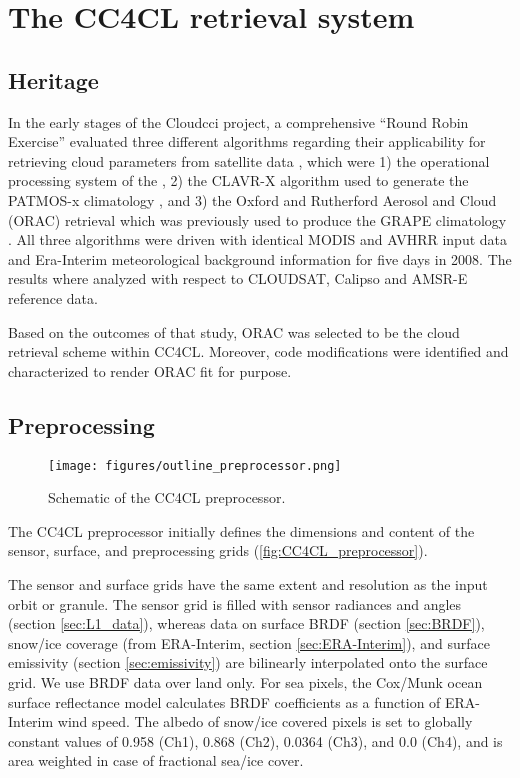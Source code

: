 \section{The CC4CL retrieval system}\label{processing_chain}

\subsection{Heritage}

In the early stages of the Cloud\textunderscore cci project, a comprehensive ``Round Robin Exercise'' evaluated
three different algorithms regarding their applicability for retrieving cloud parameters from satellite data
\citep{Stengel15}, which were 1) the operational processing system of the \citet{CMSAF_web}, 2) the CLAVR-X algorithm
used to generate the PATMOS-x climatology \citep{Heidinger13}, and 3) the Oxford and Rutherford Aerosol and
Cloud (ORAC) retrieval \citep{Thomas09, Poulsen12} which was previously used to produce the GRAPE climatology
\citep{Thomas09_GRAPE, GRAPE_web}. All three algorithms were driven with identical MODIS and AVHRR input data
and Era-Interim meteorological background information for five days in 2008. The results where analyzed with
respect to CLOUDSAT, Calipso and AMSR-E reference data. 

Based on the outcomes of that study, ORAC was selected to be the cloud retrieval scheme within CC4CL. Moreover,
code modifications were identified and characterized to render ORAC fit for purpose. 

\subsection{Preprocessing}

\begin{figure}[h]
  \texttt{[image: figures/outline\_preprocessor.png]}
  \caption{Schematic of the CC4CL preprocessor.}
  \label{fig:CC4CL_preprocessor}
\end{figure}

The CC4CL preprocessor initially defines the dimensions and content of the sensor, surface, and preprocessing
grids (\autoref{fig:CC4CL_preprocessor}). 

The sensor and surface grids have the same extent and resolution as the input orbit or granule. The sensor
grid is filled with sensor radiances and angles (section \ref{sec:L1_data}), whereas data on surface BRDF
(section \ref{sec:BRDF}), snow/ice coverage (from ERA-Interim, section \ref{sec:ERA-Interim}), and surface
emissivity (section \ref{sec:emissivity}) are bilinearly interpolated onto the surface grid. We use BRDF data
over land only. For sea pixels, the Cox/Munk ocean surface reflectance model calculates BRDF coefficients as a
function of ERA-Interim wind speed. The albedo of snow/ice covered pixels is set to globally constant values
of 0.958 (Ch1), 0.868 (Ch2), 0.0364 (Ch3), and 0.0 (Ch4), and is area weighted in case of fractional sea/ice
cover.

